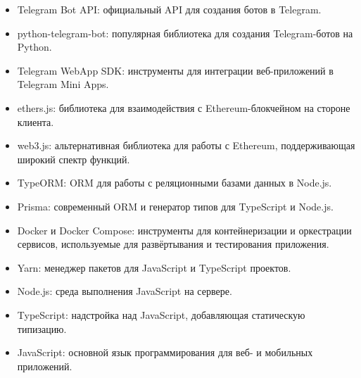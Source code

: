 \documentclass[
    14pt,
    specialist,
    candidate, %
    subf, %
    href,
    dotsinheaders=false
]{disser}
\begin{document}
\begin{itemize}
  \item Telegram Bot API: официальный API для создания ботов в Telegram. \cite{docs_telegram_bot_api_2025}

  \item python-telegram-bot: популярная библиотека для создания Telegram-ботов на Python. \cite{docs_python_telegram_bot_2025}

  \item Telegram WebApp SDK: инструменты для интеграции веб-приложений в Telegram Mini Apps. \cite{docs_telegram_webapp_sdk_2025}

  \item ethers.js: библиотека для взаимодействия с Ethereum-блокчейном на стороне клиента. \cite{docs_ethersjs_2025}

  \item web3.js: альтернативная библиотека для работы с Ethereum, поддерживающая широкий спектр функций. \cite{docs_web3js_2025}

  \item TypeORM: ORM для работы с реляционными базами данных в Node.js. \cite{docs_typeorm_2025}

  \item Prisma: современный ORM и генератор типов для TypeScript и Node.js. \cite{docs_prisma_2025}

  \item Docker и Docker Compose: инструменты для контейнеризации и оркестрации сервисов, используемые для развёртывания и тестирования приложения. \cite{docs_docker_2025,docs_docker_compose_2025}

  \item Yarn: менеджер пакетов для JavaScript и TypeScript проектов. \cite{docs_yarn_2025}

  \item Node.js: среда выполнения JavaScript на сервере. \cite{docs_nodejs_2025}

  \item TypeScript: надстройка над JavaScript, добавляющая статическую типизацию. \cite{docs_typescript_2025}

  \item JavaScript: основной язык программирования для веб- и мобильных приложений. \cite{docs_javascript_2025}

\end{itemize}
\end{document}
